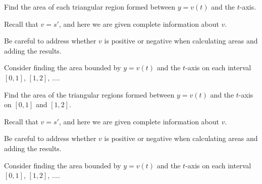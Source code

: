 \begin{smallhint}
\ba
	\item Find the area of each triangular region formed between $y = v(t)$ and the $t$-axis.
	\item Recall that $v = s'$, and here we are given complete information about $v$.
	\item Be careful to address whether $v$ is positive or negative when calculating areas and adding the results.
	\item Consider finding the area bounded by $y = v(t)$ and the $t$-axis on each interval $[0,1]$, $[1,2]$, $\ldots$.
\ea
\end{smallhint}
\begin{bighint}
\ba
	\item Find the area of the triangular regions formed between $y = v(t)$ and the $t$-axis on $[0,1]$ and $[1,2]$.
	\item Recall that $v = s'$, and here we are given complete information about $v$.
	\item Be careful to address whether $v$ is positive or negative when calculating areas and adding the results.
	\item Consider finding the area bounded by $y = v(t)$ and the $t$-axis on each interval $[0,1]$, $[1,2]$, $\ldots$.
\ea
\end{bighint}
